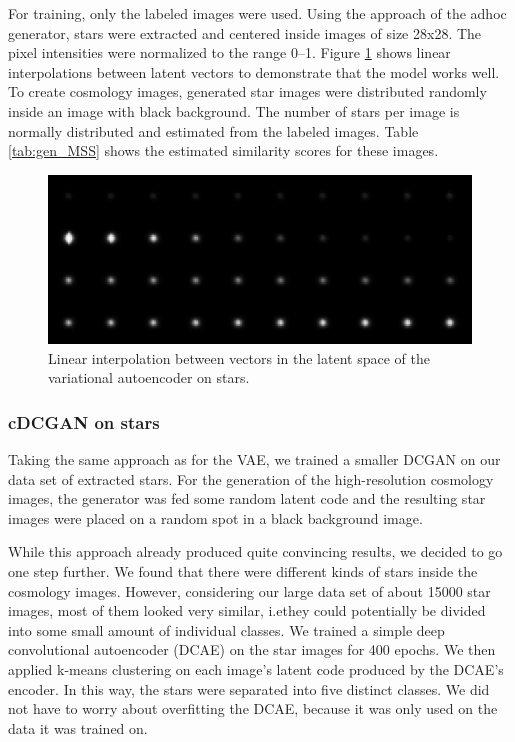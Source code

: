\documentclass[10pt,conference,compsocconf]{IEEEtran}
\begin{document}
For training, only the labeled images were used. Using the approach of the adhoc generator, stars were extracted and centered inside images of size \SI{28}{}x\SI{28}{}. The pixel intensities were normalized to the range \SIrange{0}{1}{}. Figure \ref{fig:vae_interpolation} shows linear interpolations between latent vectors to demonstrate that the model works well. To create cosmology images, generated star images were distributed randomly inside an image with black background. The number of stars per image is normally distributed and estimated from the labeled images. Table \ref{tab:gen_MSS} shows the estimated similarity scores for these images.


\begin{figure}
    \centering
    \includegraphics[width=\columnwidth]{assets/vae_interpolation_resized.png}
    \caption{Linear interpolation between vectors in the latent space of the variational autoencoder on stars.}
    \label{fig:vae_interpolation}
\end{figure}

\subsubsection{cDCGAN on stars}

Taking the same approach as for the VAE, we trained a smaller DCGAN on our data set of extracted stars. For the generation of the high-resolution cosmology images, the generator was fed some random latent code and the resulting star images were placed on a random spot in a black background image.

While this approach already produced quite convincing results, we decided to go one step further. We found that there were different kinds of stars inside the cosmology images. However, considering our large data set of about \SI{15000}{} star images, most of them looked very similar, i.e\@ they could potentially be divided into some small amount of individual classes. We trained a simple deep convolutional autoencoder (DCAE) on the star images for 400 epochs. 
We then applied k-means clustering on each image's latent code produced by the DCAE's encoder. In this way, the stars were separated into five distinct classes. We did not have to worry about overfitting the DCAE, because it was only used on the data it was trained on.
\end{document}

